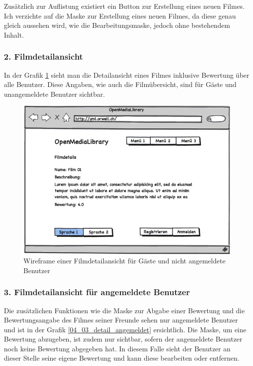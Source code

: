 Zusätzlich zur Auflistung existiert ein Button zur Erstellung eines neuen Filmes.
Ich verzichte auf die Maske zur Erstellung eines neuen Filmes, da diese genau gleich
aussehen wird, wie die Bearbeitungsmaske, jedoch ohne bestehendem Inhalt.

\subsubsection{2. Filmdetailansicht}
In der Grafik \ref{04_02_detail} sieht man die Detailansicht eines Filmes inklusive Bewertung
über alle Benutzer. Diese Angaben, wie auch die Filmübersicht, sind für Gäste und
unangemeldete Benutzer sichtbar.

\begin{figure}[ht]
    \begin{center}
        \includegraphics[width=1\textwidth,angle=0]{./wireframes/04_02_detail.png}
        \caption{Wireframe einer Filmdetailansicht für Gäste und nicht angemeldete Benutzer}
        \label{04_02_detail}
    \end{center}
\end{figure}

\clearpage

\subsubsection{3. Filmdetailansicht für angemeldete Benutzer}
Die zusätzlichen Funktionen wie die Maske zur Abgabe einer Bewertung und die Bewertungsangabe des Filmes 
seiner Freunde sehen nur angemeldete Benutzer und ist in der Grafik \ref{04_03_detail_angemeldet} 
ersichtlich. Die Maske, um eine Bewertung abzugeben, ist zudem nur sichtbar, sofern der angemeldete
Benutzer noch keine Bewertung abgegeben hat. In diesem Falle sieht der Benutzer an dieser
Stelle seine eigene Bewertung und kann diese bearbeiten oder entfernen.

